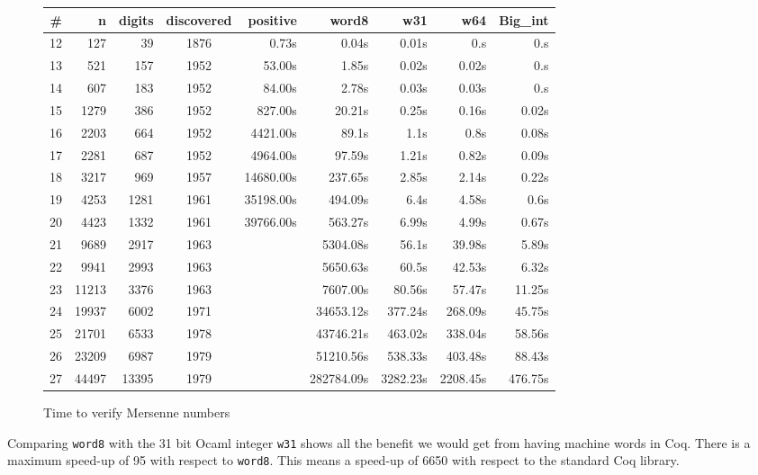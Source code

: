 \begin{figure}
\begin{center}
\begin{tabular}{|r|r|r|c|r|r|r|r|r |}
\hline
\# & n & digits & discovered &  positive & word8 & w31 & w64 & Big\_int\\
\hline
12 &  127 &  39 & 1876 &  0.73s & 0.04s & 0.01s & 0.s & 0.s \\
13 &  521 & 157 & 1952 &  53.00s & 1.85s & 0.02s & 0.02s &  0.s\\
14 &  607 & 183 & 1952 &  84.00s & 2.78s & 0.03s & 0.03s &  0.s\\
15 & 1279 & 386 & 1952 &  827.00s & 20.21s& 0.25s & 0.16s &  0.02s\\
16 & 2203 & 664 & 1952 &  4421.00s & 89.1s & 1.1s & 0.8s &  0.08s\\
17 & 2281 & 687 & 1952 &  4964.00s & 97.59s & 1.21s & 0.82s &  0.09s\\
18 & 3217 & 969 & 1957 &  14680.00s & 237.65s & 2.85s & 2.14s &  0.22s\\
19 & 4253 & 1281 & 1961 &35198.00s & 494.09s& 6.4s & 4.58s &  0.6s\\
20 & 4423 & 1332 & 1961 &  39766.00s & 563.27s & 6.99s & 4.99s &  0.67s\\
21 & 9689 & 2917  & 1963 &   & 5304.08s & 56.1s & 39.98s &  5.89s\\	 
22 & 9941 & 2993  & 1963 &   & 5650.63s & 60.5s & 42.53s &  6.32s\\	 
23 & 11213 & 3376 & 1963 &    & 7607.00s & 80.56s & 57.47s &  11.25s\\ 
24 & 19937 & 6002  & 1971 &  & 34653.12s & 377.24s & 268.09s &  45.75s\\
25 & 21701 & 6533 & 1978 &  &43746.21s & 463.02s & 338.04s &  58.56s \\
26 & 23209 & 6987 & 1979  &  &51210.56s & 538.33s & 403.48s &  88.43s\\
27 & 44497 & 13395 & 1979  &  &282784.09s & 3282.23s & 2208.45s &  476.75s \\
\hline

\end{tabular}
\end{center}
\caption{Time to verify Mersenne numbers}
\label{fig:Mersenne}
\end{figure}

Comparing {\tt word8} with the 31 bit {\sc Ocaml} integer {\tt w31} shows 
all the benefit we would get from having machine words in {\sc Coq}. 
There is a maximum speed-up of 95 with respect to {\tt word8}. This
means a speed-up of 6650 with respect to the standard {\sc Coq} library.

